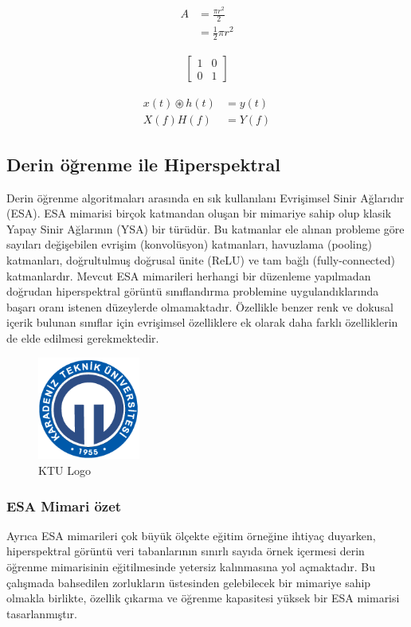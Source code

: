 \begin{equation} 
    \label{eq1}
    \begin{split}
        A & = \frac{\pi r^2}{2} \\
         & = \frac{1}{2} \pi r^2
    \end{split}
\end{equation}

\begin{align}
\left[
\begin{matrix}
1 & 0\\
0 & 1
\end{matrix}
\right]
\end{align}

\begin{align}
x(t) \circledast h(t) &= y(t) \\
X(f) H(f) &= Y(f) 
\end{align}

\subsection{Derin öğrenme ile Hiperspektral}
Derin öğrenme algoritmaları arasında en sık kullanılanı
Evrişimsel Sinir Ağlarıdır (ESA). ESA mimarisi birçok
katmandan oluşan bir mimariye sahip olup klasik Yapay
Sinir Ağlarının (YSA) bir türüdür. Bu katmanlar ele alınan
probleme göre sayıları değişebilen evrişim (konvolüsyon)
katmanları, havuzlama (pooling) katmanları, doğrultulmuş
doğrusal ünite (ReLU) ve tam bağlı (fully-connected)
katmanlardır. Mevcut ESA mimarileri herhangi bir
düzenleme yapılmadan doğrudan hiperspektral görüntü
sınıflandırma problemine uygulandıklarında başarı oranı
istenen düzeylerde olmamaktadır. Özellikle benzer renk ve
dokusal içerik bulunan sınıflar için evrişimsel özelliklere ek
olarak daha farklı özelliklerin de elde edilmesi
gerekmektedir.
\begin{figure}[!h]
  \centering
  \begin{measuredfigure} %
  \includegraphics[width=0.3\textwidth]{Figures/ktuLogo}
  \caption{KTU Logo }
  \label{fig:wordvslatex}
  \end{measuredfigure}
\end{figure}

\subsubsection{ESA Mimari özet}
 Ayrıca ESA mimarileri çok büyük ölçekte
eğitim örneğine ihtiyaç duyarken, hiperspektral görüntü veri
tabanlarının sınırlı sayıda örnek içermesi derin öğrenme
mimarisinin eğitilmesinde yetersiz kalınmasına yol
açmaktadır. Bu çalışmada bahsedilen zorlukların üstesinden
gelebilecek bir mimariye sahip olmakla birlikte, özellik
çıkarma ve öğrenme kapasitesi yüksek bir ESA mimarisi
tasarlanmıştır. 